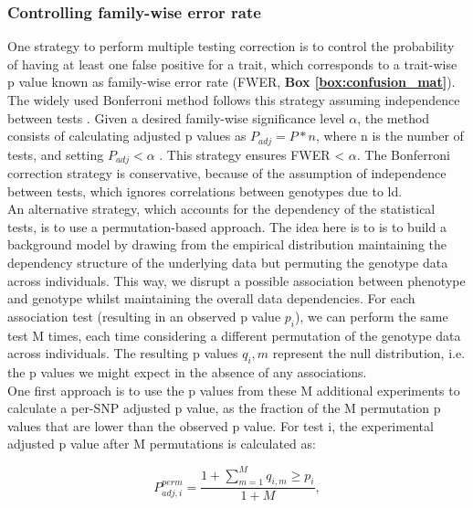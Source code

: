 \subsubsection{Controlling family-wise error rate} 

One strategy to perform multiple testing correction is to control the probability of having at least one false positive for a trait, which corresponds to a trait-wise p value known as family-wise error rate (FWER, \textbf{Box \ref{box:confusion_mat}}).
The widely used Bonferroni method follows this strategy assuming independence between tests \cite{laird2010fundamentals}. 
Given a desired family-wise significance level $\alpha$, the method consists of calculating adjusted p values as $P_{adj} = P*n $, where n is the number of tests, and setting $P_{adj} < \alpha$ . 
This strategy ensures FWER < $\alpha$. 
The Bonferroni correction strategy is conservative, because of the assumption of independence between tests, which ignores correlations between genotypes due to \gls{ld}.\\

An alternative strategy, which accounts for the dependency of the statistical tests, is to use a permutation-based approach. 
The idea here is to is to build a background model by drawing from the empirical distribution maintaining the dependency structure of the underlying data but permuting the genotype data across individuals.
This way, we disrupt a possible association between phenotype and genotype whilst maintaining the overall data dependencies. 
For each association test (resulting in an observed p value $p_i$), we can perform the same test M times, each time considering a different permutation of the genotype data across individuals. 
The resulting p values $q_i,m$ represent the null distribution, i.e. the p values we might expect in the absence of any associations.\\

One first approach is to use the
p values from these M additional experiments
to calculate a per-SNP adjusted p value, as the fraction of the M permutation p values that are lower than the observed p value. 
For test i, the experimental adjusted p value after M permutations is calculated as:

\begin{equation}\label{eq:permutation_adjusted_pvalue}
    P_{adj,i}^{perm} = \frac{1+\sum_{m=1}^{M} q_{i,m} \geq p_i}{1+M},
\end{equation}

